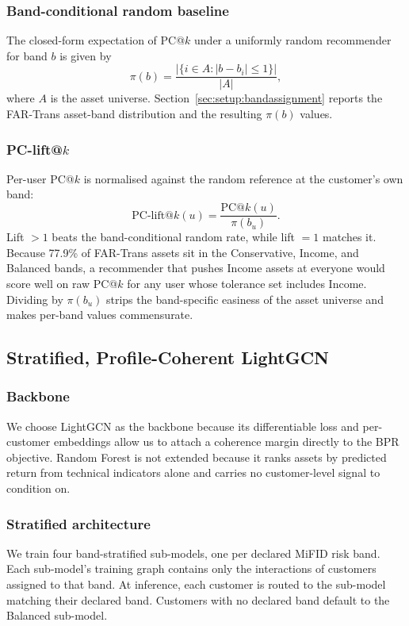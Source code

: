 \subsubsection{Band-conditional random baseline}
The closed-form expectation of PC@$k$ under a uniformly random recommender for band $b$ is given by
\begin{equation}
\pi(b) = \frac{|\{ i \in A : |b - b_i| \leq 1 \}|}{|A|},
\end{equation}
where $A$ is the asset universe. Section~\ref{sec:setup:bandassignment} reports the FAR-Trans asset-band distribution and the resulting $\pi(b)$ values.

\subsubsection{PC-lift@$k$}
Per-user PC@$k$ is normalised against the random reference at the customer's own band:
\begin{equation}
\text{PC-lift@}k(u) = \frac{\text{PC@}k(u)}{\pi(b_u)}.
\end{equation}
Lift $> 1$ beats the band-conditional random rate, while lift $= 1$ matches it. Because 77.9\% of FAR-Trans assets sit in the Conservative, Income, and Balanced bands, a recommender that pushes Income assets at everyone would score well on raw PC@$k$ for any user whose tolerance set includes Income. Dividing by $\pi(b_u)$ strips the band-specific easiness of the asset universe and makes per-band values commensurate.

\subsection{Stratified, Profile-Coherent LightGCN}
\label{sec:method:pclgcn}

\subsubsection{Backbone}
We choose LightGCN as the backbone because its differentiable loss and per-customer embeddings allow us to attach a coherence margin directly to the BPR objective. Random Forest is not extended because it ranks assets by predicted return from technical indicators alone and carries no customer-level signal to condition on.

\subsubsection{Stratified architecture}
We train four band-stratified sub-models, one per declared MiFID risk band. Each sub-model's training graph contains only the interactions of customers assigned to that band. At inference, each customer is routed to the sub-model matching their declared band. Customers with no declared band default to the Balanced sub-model.

